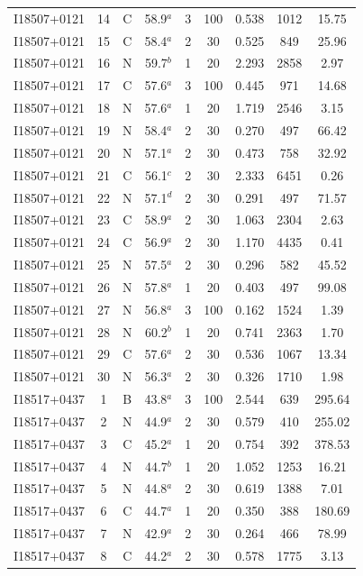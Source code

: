 \begin{table}
\begin{tabular}{ccccccccc}
I18507+0121 & 14 & C & 58.9$^{a}$ & 3 & 100 & 0.538 & 1012 & 15.75 \\
I18507+0121 & 15 & C & 58.4$^{a}$ & 2 & 30 & 0.525 & 849 & 25.96 \\
I18507+0121 & 16 & N & 59.7$^{b}$ & 1 & 20 & 2.293 & 2858 & 2.97 \\
I18507+0121 & 17 & C & 57.6$^{a}$ & 3 & 100 & 0.445 & 971 & 14.68 \\
I18507+0121 & 18 & N & 57.6$^{a}$ & 1 & 20 & 1.719 & 2546 & 3.15 \\
I18507+0121 & 19 & N & 58.4$^{a}$ & 2 & 30 & 0.270 & 497 & 66.42 \\
I18507+0121 & 20 & N & 57.1$^{a}$ & 2 & 30 & 0.473 & 758 & 32.92 \\
I18507+0121 & 21 & C & 56.1$^{c}$ & 2 & 30 & 2.333 & 6451 & 0.26 \\
I18507+0121 & 22 & N & 57.1$^{d}$ & 2 & 30 & 0.291 & 497 & 71.57 \\
I18507+0121 & 23 & C & 58.9$^{a}$ & 2 & 30 & 1.063 & 2304 & 2.63 \\
I18507+0121 & 24 & C & 56.9$^{a}$ & 2 & 30 & 1.170 & 4435 & 0.41 \\
I18507+0121 & 25 & N & 57.5$^{a}$ & 2 & 30 & 0.296 & 582 & 45.52 \\
I18507+0121 & 26 & N & 57.8$^{a}$ & 1 & 20 & 0.403 & 497 & 99.08 \\
I18507+0121 & 27 & N & 56.8$^{a}$ & 3 & 100 & 0.162 & 1524 & 1.39 \\
I18507+0121 & 28 & N & 60.2$^{b}$ & 1 & 20 & 0.741 & 2363 & 1.70 \\
I18507+0121 & 29 & C & 57.6$^{a}$ & 2 & 30 & 0.536 & 1067 & 13.34 \\
I18507+0121 & 30 & N & 56.3$^{a}$ & 2 & 30 & 0.326 & 1710 & 1.98 \\
I18517+0437 & 1 & B & 43.8$^{a}$ & 3 & 100 & 2.544 & 639 & 295.64 \\
I18517+0437 & 2 & N & 44.9$^{a}$ & 2 & 30 & 0.579 & 410 & 255.02 \\
I18517+0437 & 3 & C & 45.2$^{a}$ & 1 & 20 & 0.754 & 392 & 378.53 \\
I18517+0437 & 4 & N & 44.7$^{b}$ & 1 & 20 & 1.052 & 1253 & 16.21 \\
I18517+0437 & 5 & N & 44.8$^{a}$ & 2 & 30 & 0.619 & 1388 & 7.01 \\
I18517+0437 & 6 & C & 44.7$^{a}$ & 1 & 20 & 0.350 & 388 & 180.69 \\
I18517+0437 & 7 & N & 42.9$^{a}$ & 2 & 30 & 0.264 & 466 & 78.99 \\
I18517+0437 & 8 & C & 44.2$^{a}$ & 2 & 30 & 0.578 & 1775 & 3.13 \\

\end{tabular}
\end{table}
